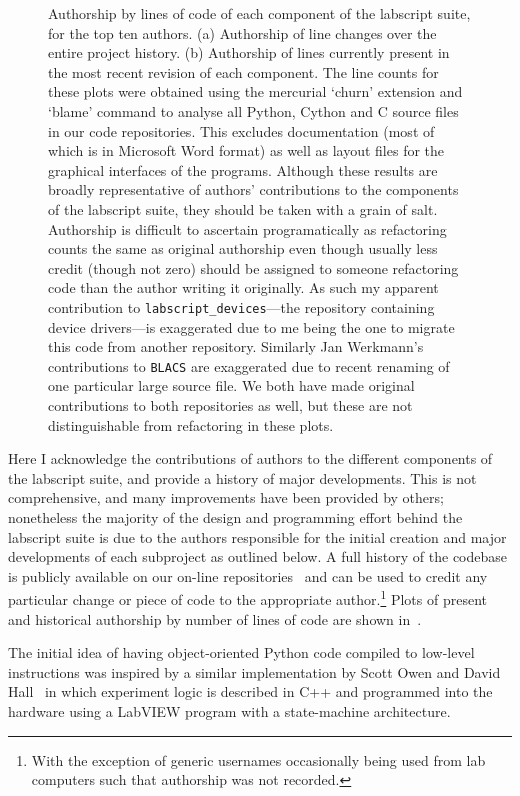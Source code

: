 \begin{figure}
    \caption{Authorship by lines of code of each component of the labscript suite, for the top ten authors. (a) Authorship of line changes over the entire project history. (b) Authorship of lines currently present in the most recent revision of each component. The line counts for these plots were obtained using the mercurial `churn' extension and `blame' command to analyse all Python, Cython and C source files in our code repositories. This excludes documentation (most of which is in Microsoft Word format) as well as layout files for the graphical interfaces of the programs. Although these results are broadly representative of authors' contributions to the components of the labscript suite, they should be taken with a grain of salt. Authorship is difficult to ascertain programatically as refactoring counts the same as original authorship even though usually less credit (though not zero) should be assigned to someone refactoring code than the author writing it originally. As such my apparent contribution to \texttt{labscript\_devices}---the repository containing device drivers---is exaggerated due to me being the one to migrate this code from another repository. Similarly Jan Werkmann's contributions to \texttt{BLACS} are exaggerated due to recent renaming of one particular large source file. We both have made original contributions to both repositories as well, but these are not distinguishable from refactoring in these plots.}\label{fig:line_counts}
\end{figure}

Here I acknowledge the contributions of authors to the different components of the labscript suite, and provide a history of major developments. This is not comprehensive, and many improvements have been provided by others; nonetheless the majority of the design and programming effort behind the labscript suite is due to the authors responsible for the initial creation and major developments of each subproject as outlined below. A full history of the codebase is publicly available on our on-line repositories~\cite{monash_univeristy_labscript_2018, starkey_qtutils_2018, billington_zprocess_2018} and can be used to credit any particular change or piece of code to the appropriate author.\footnote{With the exception of generic usernames occasionally being used from lab computers such that authorship was not recorded.} Plots of present and historical authorship by number of lines of code are shown in~.

The initial idea of having object-oriented Python code compiled to low-level instructions was inspired by a similar implementation by Scott Owen and David Hall~\cite{owen_fast_2003} in which experiment logic is described in C++ and programmed into the hardware using a LabVIEW program with a state-machine architecture.

